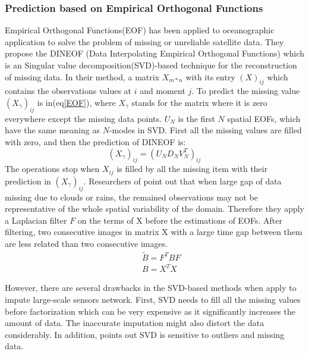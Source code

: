 \subsubsection{Prediction based on Empirical Orthogonal Functions }
Empirical Orthogonal Functions(EOF) has been applied to oceanographic application to solve the problem of missing or unreliable satellite data\cite{beckers2003eof}. 
They propose the DINEOF (Data Interpolating Empirical Orthogonal Functions) which is an Singular value decomposition(SVD)-based technique for the reconstruction of missing data.
In their method, a matrix $X_{m*n}$ with its entry $(X)_{ij}$ which contains the observations values at $i$ and moment $j$. 
To predict the missing value $(X_\gamma)_{ij}$ is in(eq\ref{EOF}), where $X_\gamma$ stands for the matrix where it is zero everywhere except the missing data points. 
$U_N$ is the first $N$ spatial EOFs, which have the same meaning as $N$-modes in SVD. 
First all the missing values are filled with zero, and then the prediction of DINEOF is:
\begin{equation}
(X_\gamma)_{ij} = (U_ND_NV_N^T)_{ij}
\label{EOF}
\end{equation}
The operations stop when $X_{ij}$ is filled by all the missing item with their prediction in $(X_\gamma)_{ij}$. 
Researchers of \cite{alvera2009enhancing} point out that when large gap of data missing due to clouds or rains, the remained observations may not be representative of the whole spatial variability of the domain. Therefore they apply a Laplacian filter $F$ on the terms of X before the estimations of EOFs. After filtering, two consecutive images in matrix X with a large time gap between them are less related than two consecutive images. 
\begin{eqnarray}
&&\tilde{B} = F^TBF \\
&&B=X^TX
\label{enhance_eof}
\end{eqnarray} 

However, there are several drawbacks in the SVD-based methods when apply to impute large-scale sensors network. First, SVD needs to fill all the missing values before factorization which can be very expensive as it significantly increases the amount of data. The inaccurate imputation might also distort the data considerably\cite{koren2009matrix}. In addition, \cite{ke2005robust} points out SVD is sensitive to outliers and missing data. 
  
